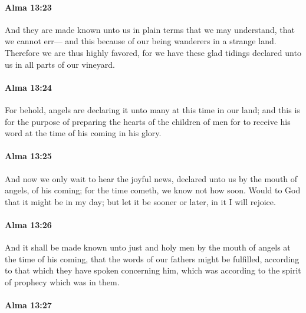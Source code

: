 		\paragraph{Alma 13:23} %
			\label{ALMA-13-23}

			And they are made known unto us in plain terms
			that we may understand, that we cannot err---
			and this because of our being wanderers in a strange land.
			Therefore we are thus highly favored,
			for we have these glad tidings declared unto us in all parts of our vineyard.

		\paragraph{Alma 13:24} %
			\label{ALMA-13-24}

			For behold, angels are declaring it unto many at this time in our land;
			and this is for the purpose of preparing the hearts of the children of men
			for to receive his word at the time of his coming in his glory.

		\paragraph{Alma 13:25} %
			\label{ALMA-13-25}

			And now we only wait to hear the joyful news,
			declared unto us by the mouth of angels,
			of his coming;
			for the time cometh,
			we know not how soon.
			Would to God that it might be in my day;
			but let it be sooner or later,
			in it I will rejoice.

		\paragraph{Alma 13:26} %
			\label{ALMA-13-26}

			And it shall be made known unto just and holy men
			by the mouth of angels at the time of his coming,
			that the words of our fathers might be fulfilled,
			according to that which they have spoken concerning him,
			which was according to the spirit of prophecy which was in them.

		\paragraph{Alma 13:27} %
			\label{ALMA-13-27}

